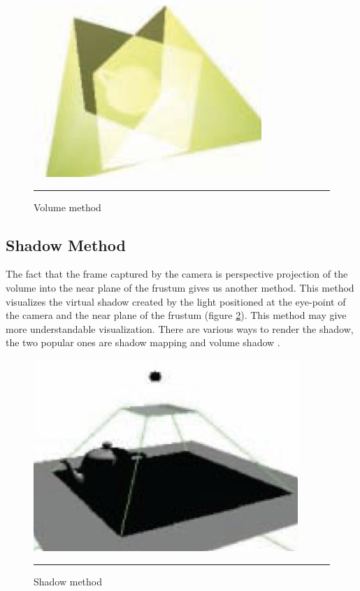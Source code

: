 \begin{figure}[htbp]
	\centering
	\includegraphics{./Primitives/theory_volume.png}
	\rule{35em}{0.5pt}
	\caption[Volume method]{Volume method}
	\label{fig:VolumeMethod}
\end{figure}

\subsection{Shadow Method}

The fact that the frame captured by the camera is perspective projection of the volume into the near plane of the frustum gives us another method. This method visualizes the virtual shadow created by the light positioned at the eye-point of the camera and the near plane of the frustum (figure \ref{fig:ShadowMethod}). This method may give more understandable visualization. There are various ways to render the shadow, the two popular ones are shadow mapping \cite{Reference7} \cite{Reference8} and volume shadow \cite{Reference9}.

\begin{figure}[htbp]
	\centering
	\includegraphics{./Primitives/theory_shadow.png}
	\rule{35em}{0.5pt}
	\caption[Shadow method]{Shadow method}
	\label{fig:ShadowMethod}
\end{figure}

